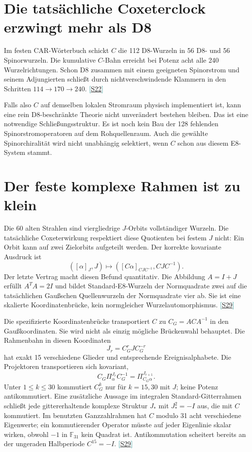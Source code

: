 \documentclass[11pt,a4paper,oneside,parskip=half,headings=normal,numbers=noenddot,bibliography=totoc]{scrreprt}
\newcommand{\F}{\mathbb F}
\newcommand{\src}[1]{\textcolor{teal}{\small[\hyperref[s:#1]{S#1}]}}
\begin{document}
\section{Die tatsächliche Coxeterclock erzwingt mehr als D8}
Im festen CAR-Wörterbuch schickt $C$ die 112 D8-Wurzeln in 56 D8- und 56 Spinorwurzeln. Die kumulative $C$-Bahn erreicht bei Potenz acht alle 240 Wurzelrichtungen. Schon D8 zusammen mit einem geeigneten Spinorstrom und seinem Adjungierten schließt durch nichtverschwindende Klammern in den Schritten $114\to170\to240$. \src{22}

Falls also $C$ auf demselben lokalen Stromraum physisch implementiert ist, kann eine rein D8-beschränkte Theorie nicht unverändert bestehen bleiben. Das ist eine notwendige Schließungsstruktur. Es ist noch kein Bau der 128 fehlenden Spinorstromoperatoren auf dem Rohquellenraum. Auch die gewählte Spinorchiralität wird nicht unabhängig selektiert, wenn $C$ schon aus diesem E8-System stammt.

\section{Der feste komplexe Rahmen ist zu klein}
Die 60 alten Strahlen sind viergliedrige $J$-Orbits vollständiger Wurzeln. Die tatsächliche Coxeterwirkung respektiert diese Quotienten bei festem $J$ nicht: Ein Orbit kann auf zwei Zielorbits aufgeteilt werden. Der korrekte kovariante Ausdruck ist
\[
 ([\alpha]_J,J)\longmapsto
 ([C\alpha]_{CJC^{-1}},CJC^{-1}).
\]
Der letzte Vertrag macht diesen Befund quantitativ. Die Abbildung $A=I+J$ erfüllt $A^TA=2I$ und bildet Standard-E8-Wurzeln der Normquadrate zwei auf die tatsächlichen Gaußschen Quellenwurzeln der Normquadrate vier ab. Sie ist eine skalierte Koordinatenbrücke, kein normgleicher Wurzelautomorphismus. \src{29}

Die spezifizierte Koordinatenbrücke transportiert $C$ zu $C_G=ACA^{-1}$ in den Gaußkoordinaten. Sie wird nicht als einzig mögliche Brückenwahl behauptet. Die Rahmenbahn in diesen Koordinaten
\[
 J_r=C_G^rJC_G^{-r}
\]
hat exakt 15 verschiedene Glieder und entsprechende Ereignisalphabete. Die Projektoren transportieren sich kovariant,
\[
 C_G\Pi_\alpha^{J_r}C_G^{-1}=\Pi_{C_G\alpha}^{J_{r+1}}.
\]
Unter $1\le k\le30$ kommutiert $C_G^k$ nur für $k=15,30$ mit $J$; keine Potenz antikommutiert. Eine zusätzliche Aussage im integralen Standard-Gitterrahmen schließt jede gittererhaltende komplexe Struktur $J_*$ mit $J_*^2=-I$ aus, die mit $C$ kommutiert. Im benutzten Ganzzahlrahmen hat $C$ modulo 31 acht verschiedene Eigenwerte; ein kommutierender Operator müsste auf jeder Eigenlinie skalar wirken, obwohl $-1$ in $\F_{31}$ kein Quadrat ist. Antikommutation scheitert bereits an der ungeraden Halbperiode $C^{15}=-I$. \src{29}
\end{document}
